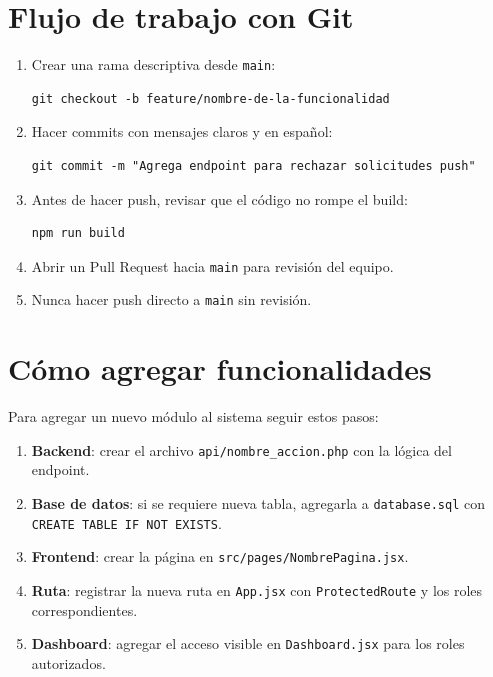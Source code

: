 \documentclass[10pt,letterpaper]{report}
\begin{document}
\section{Flujo de trabajo con Git}

\begin{enumerate}[label=\arabic*.]
  \item Crear una rama descriptiva desde \texttt{main}:
  \begin{lstlisting}[style=bashstyle]
git checkout -b feature/nombre-de-la-funcionalidad
  \end{lstlisting}

  \item Hacer commits con mensajes claros y en español:
  \begin{lstlisting}[style=bashstyle]
git commit -m "Agrega endpoint para rechazar solicitudes push"
  \end{lstlisting}

  \item Antes de hacer push, revisar que el código no rompe el build:
  \begin{lstlisting}[style=bashstyle]
npm run build
  \end{lstlisting}

  \item Abrir un Pull Request hacia \texttt{main} para revisión del equipo.

  \item Nunca hacer push directo a \texttt{main} sin revisión.
\end{enumerate}

\section{Cómo agregar funcionalidades}

Para agregar un nuevo módulo al sistema seguir estos pasos:

\begin{enumerate}[label=\arabic*.]
  \item \textbf{Backend}: crear el archivo \texttt{api/nombre\_accion.php} con la lógica del endpoint.
  \item \textbf{Base de datos}: si se requiere nueva tabla, agregarla a \texttt{database.sql} con \texttt{CREATE TABLE IF NOT EXISTS}.
  \item \textbf{Frontend}: crear la página en \texttt{src/pages/NombrePagina.jsx}.
  \item \textbf{Ruta}: registrar la nueva ruta en \texttt{App.jsx} con \texttt{ProtectedRoute} y los roles correspondientes.
  \item \textbf{Dashboard}: agregar el acceso visible en \texttt{Dashboard.jsx} para los roles autorizados.
\end{enumerate}
\end{document}
